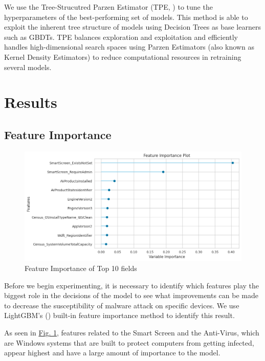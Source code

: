 \documentclass[pdflatex,sn-basic,10pt]{sn-jnl}%
\newcommand{\reffig}[1]{\hyperref[#1]{Fig. \ref*{#1}}}
\begin{document}
We use the Tree-Strucutred Parzen Estimator (TPE, \cite{bergstra2011algorithms}) to tune the hyperparameters of the best-performing set of models. This method is able to exploit the inherent tree structure of models using Decision Trees as base learners such as GBDTs. TPE balances exploration and exploitation and efficiently handles high-dimensional search spaces using Parzen Estimators (also known as Kernel Density Estimators) to reduce computational resources in retraining several models.

\section{Results}\label{sec:results}

\subsection{Feature Importance}\label{subsec:feature-importance}

\begin{figure}[!ht]
\includegraphics[scale=0.5]{images/importance}
\centering
\caption{Feature Importance of Top 10 fields}
\label{fig:fig-3}
\end{figure}

Before we begin experimenting, it is necessary to identify which features play the biggest role in the decisions of the model to see what improvements can be made to decrease the susceptibility of malware attack on specific devices. We use LightGBM's (\cite{meng2016communication,ke2017lightgbm}) built-in feature importance method to identify this result.

As seen in \reffig{fig:fig-3}, features related to the Smart Screen and the Anti-Virus, which are Windows systems that are built to protect computers from getting infected, appear highest and have a large amount of importance to the model.
\end{document}
